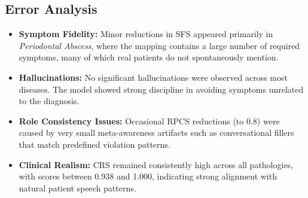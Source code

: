 \documentclass{article}
\begin{document}
\subsection{Error Analysis}

\begin{itemize}
    \item \textbf{Symptom Fidelity:}  
    Minor reductions in SFS appeared primarily in  \textit{Periodontal Abscess}, where the mapping contains a large number of required symptoms, many of which real patients do not spontaneously mention.
    
    \item \textbf{Hallucinations:}  
    No significant hallucinations were observed across most diseases. The model showed strong discipline in avoiding symptoms unrelated to the diagnosis.

    \item \textbf{Role Consistency Issues:}  
    Occasional RPCS reductions (to 0.8) were caused by very small meta-awareness artifacts such as conversational fillers that match predefined violation patterns.

    \item \textbf{Clinical Realism:}  
    CRS remained consistently high across all pathologies, with scores between 0.938 and 1.000, indicating strong alignment with natural patient speech patterns.
\end{itemize}
\end{document}
